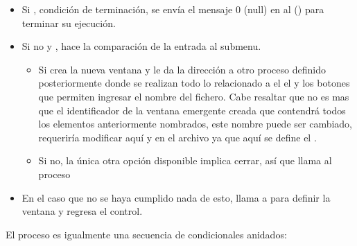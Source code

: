 \begin{itemize}
    \item  Si , condición de terminación, se envía el
        mensaje 0 (null) en  al  ()
        para terminar su ejecución.

    \item Si no y , hace la comparación de la entrada
        al submenu.

        \begin{itemize}
            \item Si  crea la nueva ventana y le da la
                 dirección a otro proceso definido posteriormente donde se realizan
                todo lo relacionado a el
                el  y los botones que permiten ingresar el
                nombre del fichero. Cabe resaltar que  no
                es mas que el identificador de la ventana emergente creada que
                contendrá todos los elementos anteriormente nombrados, este
                nombre puede ser cambiado, requeriría modificar aquí y en
                el archivo  ya que aquí se define el
                .

            \item Si no, la única otra opción disponible implica cerrar, así que
                llama al proceso 

        \end{itemize}

    \item En el caso que no se haya cumplido nada de esto, llama a
         para definir la ventana y regresa el control.
\end{itemize}



El proceso  es igualmente una secuencia de condicionales anidados:


